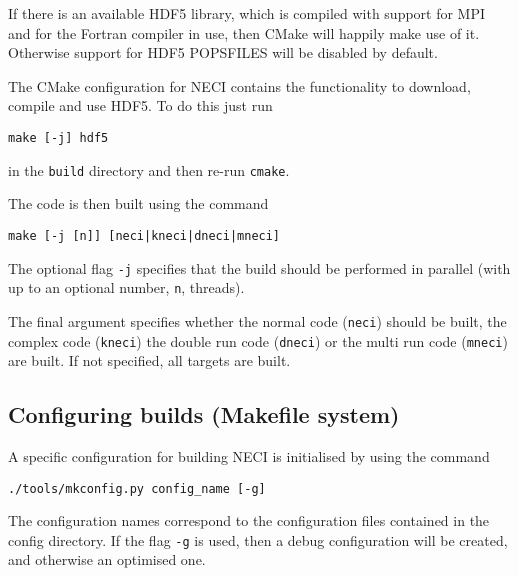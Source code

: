 \documentclass[a4paper,notitlepage]{scrreprt}
\let\code\lstinline
\begin{document}
	\begin{mdframed}[ %
		linewidth = 2pt, %
		linecolor = red, %
		roundcorner = 6pt, %
		leftmargin = 10, %
		rightmargin = 10, %
		backgroundcolor = gray!20
	]
	If there is an available HDF5 library, which is compiled with support for
	MPI and for the Fortran compiler in use, then CMake will happily make use
	of it. Otherwise support for HDF5 POPSFILES will be disabled by default.

	The CMake configuration for NECI contains the functionality to download,
	compile and use HDF5. To do this just run
	\begin{lstlisting}[gobble=4]
		make [-j] hdf5
	\end{lstlisting}
	in the \code{build} directory and then re-run \code{cmake}.
	\end{mdframed}

	The code is then built using the command
	\begin{lstlisting}[gobble=4]
		make [-j [n]] [neci|kneci|dneci|mneci]
	\end{lstlisting}
	The optional flag \code{-j} specifies that the build should be
	performed in parallel (with up to an optional number, \code{n},
	threads).

	The final argument specifies whether the normal code (\code{neci})
	should be built, the complex code (\code{kneci}) the double run
	code (\code{dneci}) or the multi run code (\code{mneci}) are
	built. If not specified, all targets are built.

\subsection{Configuring builds (Makefile system)}
	A specific configuration for building NECI is initialised by using the
	command
	\begin{lstlisting}[gobble=4]
		./tools/mkconfig.py config_name [-g]
	\end{lstlisting}
	The configuration names correspond to the configuration files contained in
	the config directory. If the flag \code{-g} is used, then a debug
	configuration will be created, and otherwise an optimised one.
	
\end{document}
